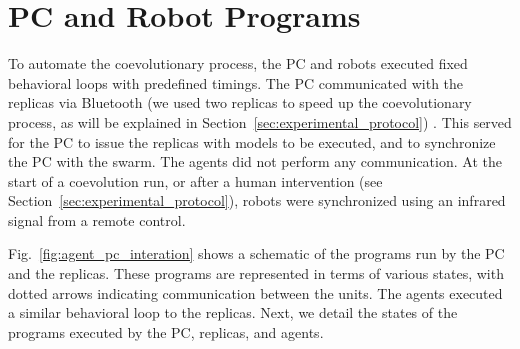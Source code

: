 \section{PC and Robot Programs}\label{pc_and_robot_programs_swarm_physical}
To automate the coevolutionary process, the PC and robots executed fixed behavioral loops with predefined timings. The PC communicated with the replicas via Bluetooth (we used two replicas to speed up the coevolutionary process, as will be explained in Section~\ref{sec:experimental_protocol}) . This served for the PC to issue the replicas with models to be executed, and to synchronize the PC with the swarm. The agents did not perform any communication. At the start of a coevolution run, or after a human intervention (see Section~\ref{sec:experimental_protocol}), robots were synchronized using an infrared signal from a remote control.

Fig.~\ref{fig:agent_pc_interation} shows a schematic of the programs run by the PC and the replicas. These programs are represented in terms of various states, with dotted arrows indicating communication between the units. The agents executed a similar behavioral loop to the replicas. Next, we detail the states of the programs executed by the PC, replicas, and agents.


